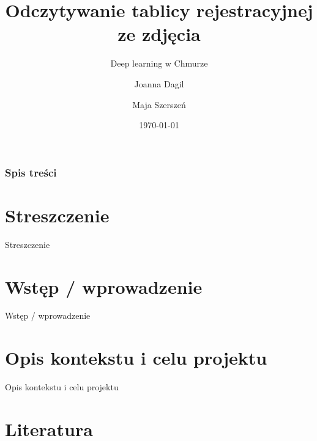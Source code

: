 \documentclass{beamer}
\title[Odczyt tablicy rejestracyjnej]{Odczytywanie tablicy rejestracyjnej ze zdjęcia}
\subtitle{Deep learning w Chmurze}
\author{Joanna Dagil \and Maja Szerszeń}
\date{\today}
\begin{document}
\frame{\titlepage}


\begin{frame}
\frametitle{Spis treści}
\tableofcontents
\end{frame}


\section{Streszczenie}

\begin{frame}{Streszczenie}

\end{frame}






\section{Wstęp / wprowadzenie}

\begin{frame}{Wstęp / wprowadzenie}


\end{frame}



\section{Opis kontekstu i celu projektu}


\begin{frame}{Opis kontekstu i celu projektu}

\end{frame}



\section{Literatura}
\end{document}
